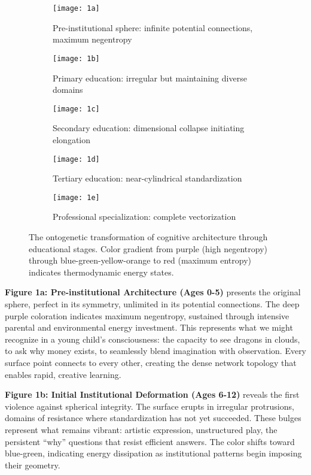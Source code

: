 \begin{figure}[htbp]
\centering
\begin{subfigure}[b]{0.18\textwidth}
    \centering
    \texttt{[image: 1a]}
    \caption{\small Pre-institutional sphere: infinite potential connections, maximum negentropy}
\end{subfigure}
\hfill
\begin{subfigure}[b]{0.18\textwidth}
    \centering
    \texttt{[image: 1b]}
    \caption{\small Primary education: irregular but maintaining diverse domains}
\end{subfigure}
\hfill
\begin{subfigure}[b]{0.18\textwidth}
    \centering
    \texttt{[image: 1c]}
    \caption{\small Secondary education: dimensional collapse initiating elongation}
\end{subfigure}
\hfill
\begin{subfigure}[b]{0.18\textwidth}
    \centering
    \texttt{[image: 1d]}
    \caption{\small Tertiary education: near-cylindrical standardization}
\end{subfigure}
\hfill
\begin{subfigure}[b]{0.18\textwidth}
    \centering
    \texttt{[image: 1e]}
    \caption{\small Professional specialization: complete vectorization}
\end{subfigure}
\caption{The ontogenetic transformation of cognitive architecture through educational stages. Color gradient from purple (high negentropy) through blue-green-yellow-orange to red (maximum entropy) indicates thermodynamic energy states.}
\label{fig:from-sphere-to-vector}
\end{figure}

\textbf{Figure 1a: Pre-institutional Architecture (Ages 0-5)} presents the original sphere, perfect in its symmetry, unlimited in its potential connections. The deep purple coloration indicates maximum negentropy, sustained through intensive parental and environmental energy investment. This represents what we might recognize in a young child's consciousness: the capacity to see dragons in clouds, to ask why money exists, to seamlessly blend imagination with observation. Every surface point connects to every other, creating the dense network topology that enables rapid, creative learning.

\textbf{Figure 1b: Initial Institutional Deformation (Ages 6-12)} reveals the first violence against spherical integrity. The surface erupts in irregular protrusions, domains of resistance where standardization has not yet succeeded. These bulges represent what remains vibrant: artistic expression, unstructured play, the persistent ``why'' questions that resist efficient answers. The color shifts toward blue-green, indicating energy dissipation as institutional patterns begin imposing their geometry.

